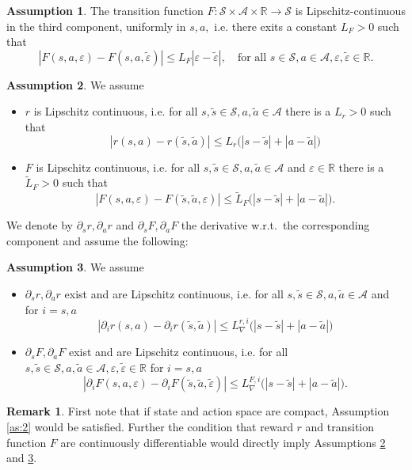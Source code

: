 \documentclass[reqno, 11pt]{amsart}%
\newcommand\cA{\mathcal A}
\newcommand\cS{\mathcal S}
\newcommand\RR{\mathbb R}
\theoremstyle{definition}
\newtheorem{remark}[theorem]{Remark}
\newtheorem{assumption}{Assumption}  %
\begin{document}
\begin{assumption}
	\label{as:3} The transition function $F:\cS \times \cA \times \RR \to \cS$ is Lipschitz-continuous in the third component, uniformly in $s,a,$ i.e. there exits a constant $L_F>0$ such that
    $$ |F(s,a,\varepsilon)-F(s,a,\tilde\varepsilon)| \le L_F |\varepsilon-\tilde\varepsilon|, \quad \mbox{for all } s\in \cS,  a\in \cA, \varepsilon, \tilde\varepsilon \in\RR.$$
\end{assumption}

\begin{assumption} \label{ass:rFLip}
We assume
\begin{itemize}
\item[(i)]$r$ is Lipschitz continuous, i.e. for all $s,\tilde s\in \cS,a,\tilde a \in \cA $ there is a $L_r>0$ such that
$$|r(s,a)-r(\tilde s,\tilde a)| \le L_{r}\big( |s-\tilde s| + |a-\tilde a| \big) $$
\item[(ii)] $F$ is  Lipschitz continuous, i.e. for all $s,\tilde s\in \cS,a, \tilde a \in \cA $ and $\varepsilon \in\RR$ there is a $\tilde L_F>0$ such that
$$|F(s,a,\varepsilon)-F(\tilde s,\tilde a,\varepsilon)| \le \tilde L_{F} \big( |s-\tilde s| + |a-\tilde a|\big). $$
\end{itemize}
\end{assumption}

We denote by $\partial_s r, \partial_a r$ and $\partial_s  F, \partial_a F $ the derivative w.r.t.\ the corresponding component and assume the following:

\begin{assumption} \label{ass:rFLipgrad}
We assume
\begin{itemize}
\item[(i)]$\partial_s r, \partial_a r$ exist and are  Lipschitz continuous, i.e. for all $s,\tilde s\in \cS,a, \tilde a \in \cA $ and for $i=s,a$
$$|\partial_i r(s,a)-\partial_ir(\tilde s,\tilde a)| \le L_{\nabla}^{r,i} \big( |s-\tilde s| + |a-\tilde a|  \big)$$
\item[(ii)] $\partial_s  F, \partial_a F$ exist and are Lipschitz continuous, i.e. for all $s,\tilde s\in \cS,a, \tilde a \in \cA,\varepsilon,\tilde\varepsilon\in\RR $ for $ i=s,a$
$$|\partial_iF(s,a,\varepsilon)-\partial_i F(\tilde s,\tilde a,\tilde\varepsilon)| \le L_{\nabla}^{F,i} \big( |s-\tilde s| + |a-\tilde a|\big). $$
\end{itemize}
\end{assumption}

\begin{remark}
    First note that if state and action space are compact, Assumption \ref{as:2} would be satisfied. Further the condition that reward $r$ and transition function $F$
 are continuously differentiable would directly imply Assumptions \ref{ass:rFLip} and \ref{ass:rFLipgrad}.
 \end{remark}
\end{document}
